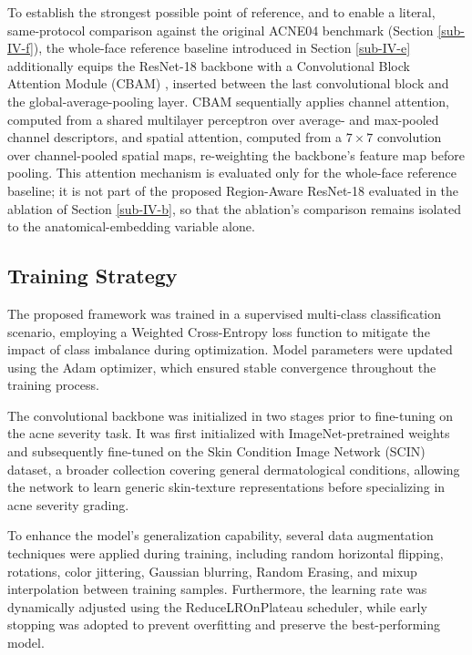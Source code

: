 \documentclass[conference]{IEEEtran}
\begin{document}
To establish the strongest possible point of reference, and to enable a literal, same-protocol comparison against the original ACNE04 benchmark (Section \ref{sub-IV-f}), the whole-face reference baseline introduced in Section \ref{sub-IV-e} additionally equips the ResNet-18 backbone with a Convolutional Block Attention Module (CBAM) \cite{b31}, inserted between the last convolutional block and the global-average-pooling layer. CBAM sequentially applies channel attention, computed from a shared multilayer perceptron over average- and max-pooled channel descriptors, and spatial attention, computed from a $7\times7$ convolution over channel-pooled spatial maps, re-weighting the backbone's feature map before pooling. This attention mechanism is evaluated only for the whole-face reference baseline; it is not part of the proposed Region-Aware ResNet-18 evaluated in the ablation of Section \ref{sub-IV-b}, so that the ablation's comparison remains isolated to the anatomical-embedding variable alone.

\subsection{Training Strategy}\label{sub-III-c}

The proposed framework was trained in a supervised multi-class classification scenario, employing a Weighted Cross-Entropy loss function to mitigate the impact of class imbalance during optimization. Model parameters were updated using the Adam optimizer, which ensured stable convergence throughout the training process.

The convolutional backbone was initialized in two stages prior to fine-tuning on the acne severity task. It was first initialized with ImageNet-pretrained weights and subsequently fine-tuned on the Skin Condition Image Network (SCIN) dataset, a broader collection covering general dermatological conditions, allowing the network to learn generic skin-texture representations before specializing in acne severity grading.

To enhance the model's generalization capability, several data augmentation techniques were applied during training, including random horizontal flipping, rotations, color jittering, Gaussian blurring, Random Erasing, and mixup interpolation between training samples. Furthermore, the learning rate was dynamically adjusted using the ReduceLROnPlateau scheduler, while early stopping was adopted to prevent overfitting and preserve the best-performing model.
\end{document}
